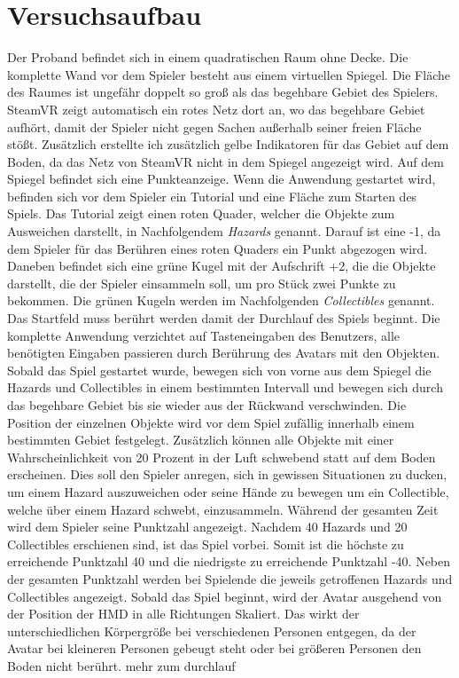 \section{Versuchsaufbau}
Der Proband befindet sich in einem quadratischen Raum ohne Decke. Die komplette Wand vor dem Spieler besteht aus einem virtuellen Spiegel. Die Fläche des Raumes ist ungefähr doppelt so groß als das begehbare Gebiet des Spielers. SteamVR zeigt automatisch ein rotes Netz dort an, wo das begehbare Gebiet aufhört, damit der Spieler nicht gegen Sachen außerhalb seiner freien Fläche stößt. Zusätzlich erstellte ich zusätzlich gelbe Indikatoren für das Gebiet auf dem Boden, da das Netz von SteamVR nicht in dem Spiegel angezeigt wird. Auf dem Spiegel befindet sich eine Punkteanzeige.
Wenn die Anwendung gestartet wird, befinden sich vor dem Spieler ein Tutorial und eine Fläche zum Starten des Spiels. Das Tutorial zeigt einen roten Quader, welcher die Objekte zum Ausweichen darstellt, in Nachfolgendem \textit{Hazards} genannt. Darauf ist eine -1, da dem Spieler für das Berühren eines roten Quaders ein Punkt abgezogen wird. Daneben befindet sich eine grüne Kugel mit der Aufschrift +2, die die Objekte darstellt, die der Spieler einsammeln soll, um pro Stück zwei Punkte zu bekommen. Die grünen Kugeln werden im Nachfolgenden \textit{Collectibles} genannt.
Das Startfeld muss berührt werden damit der Durchlauf des Spiels beginnt. Die komplette Anwendung verzichtet auf Tasteneingaben des Benutzers, alle benötigten Eingaben passieren durch Berührung des Avatars mit den Objekten.
Sobald das Spiel gestartet wurde, bewegen sich von vorne aus dem Spiegel die Hazards und Collectibles in einem bestimmten Intervall und bewegen sich durch das begehbare Gebiet bis sie wieder aus der Rückwand verschwinden. Die Position der einzelnen Objekte wird vor dem Spiel zufällig innerhalb einem bestimmten Gebiet festgelegt. Zusätzlich können alle Objekte mit einer Wahrscheinlichkeit von 20 Prozent in der Luft schwebend statt auf dem Boden erscheinen. Dies soll den Spieler anregen, sich in gewissen Situationen zu ducken, um einem Hazard auszuweichen oder seine Hände zu bewegen um ein Collectible, welche über einem Hazard schwebt, einzusammeln. Während der gesamten Zeit wird dem Spieler seine Punktzahl angezeigt. Nachdem 40 Hazards und 20 Collectibles erschienen sind, ist das Spiel vorbei. Somit ist die höchste zu erreichende Punktzahl 40 und die niedrigste zu erreichende Punktzahl -40. Neben der gesamten Punktzahl werden bei Spielende die jeweils getroffenen Hazards und Collectibles angezeigt.
Sobald das Spiel beginnt, wird der Avatar ausgehend von der Position der HMD in alle Richtungen Skaliert. Das wirkt der unterschiedlichen Körpergröße bei verschiedenen Personen entgegen, da der Avatar bei kleineren Personen gebeugt steht oder bei größeren Personen den Boden nicht berührt.
mehr zum durchlauf

